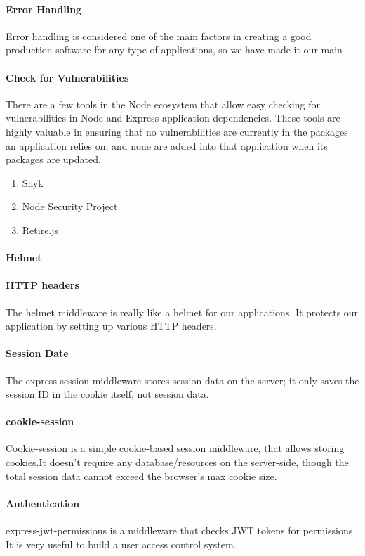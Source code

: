 \paragraph*{Error Handling}
Error handling is considered one of the main factors in creating a good production software for any type of applications, so we have made it our main 
\paragraph*{Check for Vulnerabilities}
There are a few tools in the Node ecosystem that allow easy checking for vulnerabilities in Node and Express application dependencies. These tools are highly valuable in ensuring that no vulnerabilities are currently in the packages an application relies on, and none are added into that application when its packages are updated.
\begin{enumerate}
      \item Snyk
      \item Node Security Project
      \item Retire.js
\end{enumerate}

\paragraph*{Helmet}
\paragraph*{HTTP headers}
The helmet middleware is really like a helmet for our applications. It protects our application by setting up various HTTP headers.
\paragraph*{Session Date}
The express-session middleware stores session data on the server; it only saves the session ID in the cookie itself, not session data.

\paragraph*{cookie-session}
Cookie-session is a simple cookie-based session middleware, that allows storing cookies.It doesn't require any database/resources on the server-side, though the total session data cannot exceed the browser’s max cookie size.

\paragraph*{Authentication}
express-jwt-permissions is a middleware that checks \ac{JWT} tokens for permissions. It is very useful to build a user access control system.

